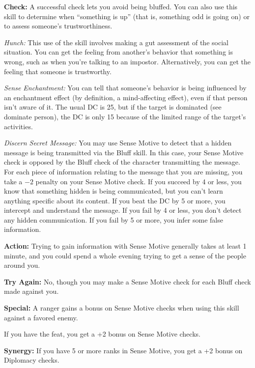 \textbf{Check:} A successful check lets you avoid being bluffed. You can also use this skill to determine when ``something is up'' (that is, something odd is going on) or to assess someone's trustworthiness.


\textit{Hunch:} This use of the skill involves making a gut assessment of the social situation. You can get the feeling from another's behavior that something is wrong, such as when you're talking to an impostor. Alternatively, you can get the feeling that someone is trustworthy.

\textit{Sense Enchantment:} You can tell that someone's behavior is being influenced by an enchantment effect (by definition, a mind-affecting effect), even if that person isn't aware of it. The usual DC is 25, but if the target is dominated (see dominate person), the DC is only 15 because of the limited range of the target's activities.

\textit{Discern Secret Message:} You may use Sense Motive to detect that a hidden message is being transmitted via the Bluff skill. In this case, your Sense Motive check is opposed by the Bluff check of the character transmitting the message. For each piece of information relating to the message that you are missing, you take a $-2$ penalty on your Sense Motive check. If you succeed by 4 or less, you know that something hidden is being communicated, but you can't learn anything specific about its content. If you beat the DC by 5 or more, you intercept and understand the message. If you fail by 4 or less, you don't detect any hidden communication. If you fail by 5 or more, you infer some false information.

\textbf{Action:} Trying to gain information with Sense Motive generally takes at least 1 minute, and you could spend a whole evening trying to get a sense of the people around you.

\textbf{Try Again:} No, though you may make a Sense Motive check for each Bluff check made against you.

\textbf{Special:} A ranger gains a bonus on Sense Motive checks when using this skill against a favored enemy.

If you have the  feat, you get a +2 bonus on Sense Motive checks.

\textbf{Synergy:} If you have 5 or more ranks in Sense Motive, you get a +2 bonus on Diplomacy checks.